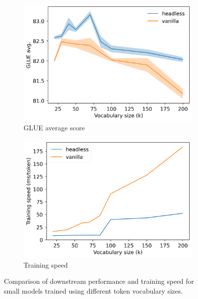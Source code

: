 \begin{figure}[h]
    \centering
    \begin{subfigure}[b]{0.48\columnwidth}
         \includegraphics[width=\linewidth]{sources/part_2/headless/imgs/bert_vocabsize_p13.png}
         \caption{GLUE average score}
         \label{fig:glue_tokencount}
    \end{subfigure}
    \begin{subfigure}[b]{0.48\columnwidth}
         \includegraphics[width=\linewidth]{sources/part_2/headless/imgs/speed_vocabsize_p13.png}
         \caption{Training speed}
         \label{fig:throughput_tokencount}
    \end{subfigure}
    \caption{Comparison of downstream performance and training speed for small models trained using different token vocabulary sizes.}
    \label{fig:tokencount}
\end{figure}

